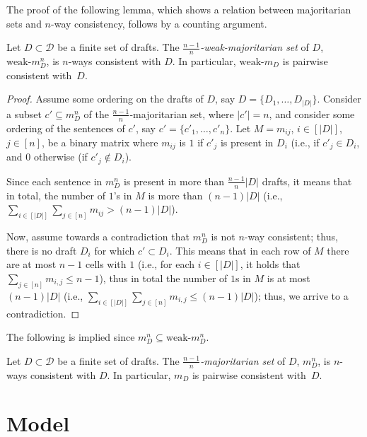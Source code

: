 \documentclass{llncs}
\newcommand{\calD}{\mathcal{D}}
\begin{document}
The proof of the following lemma, which shows a relation between majoritarian sets and $n$-way consistency, follows by a counting argument.

\begin{lemma}\label{lemma:wm-nwc}
  Let $D \subset \calD$ be a finite set of drafts. The \emph{$\frac{n-1}{n}$-weak-majoritarian set} of $D$, $\textrm{weak-}m^n_D$, is $n$-ways consistent with $D$. In particular, $\textrm{weak-}m_D$ is pairwise consistent with~$D$.
\end{lemma}

\begin{proof}
%
Assume some ordering on the drafts of $D$, say $D = \{D_1, \ldots, D_{|D|}\}$.
%
Consider a subset $c' \subseteq m^n_D$ of the $\frac{n-1}{n}$-majoritarian set, where $|c'| = n$, and consider some ordering of the sentences of $c'$, say $c' = \{c'_1, \ldots, c'_n\}$.
%
Let $M = m_{ij}$, $i \in [|D|]$, $j \in [n]$, be a binary matrix where $m_{ij}$ is $1$ if $c'_j$ is present in $D_i$ (i.e., if $c'_j \in D_i$, and $0$ otherwise (if $c'_j \notin D_i$).

Since each sentence in $m^n_D$ is present in more than $\frac{n-1}{n}|D|$ drafts, it means that in total, the number of $1$'s in $M$ is more than $(n-1)|D|$  (i.e., $\sum_{i \in [|D|]} \sum_{j \in [n]} m_{ij} > (n - 1)|D|$).

Now, assume towards a contradiction that $m^n_D$ is not $n$-way consistent; thus, there is no draft $D_i$ for which $c' \subset D_i$. This means that in each row of $M$ there are at most $n - 1$ cells with $1$ (i.e., for each $i \in [|D|]$, it holds that $\sum_{j \in [n]} m_{i,j} \leq n - 1$), thus in total the number of $1$s in $M$ is at most $(n - 1)|D|$ (i.e., $\sum_{i \in [|D|]}\sum_{j \in [n]} m_{i,j} \leq (n - 1)|D|$); thus, we arrive to a contradiction.
%
\end{proof}

The following is implied since $m^n_D \subseteq \textrm{weak-}m^n_D$.

\begin{corollary}
  Let $D \subset \calD$ be a finite set of drafts. The \emph{$\frac{n-1}{n}$-majoritarian set} of $D$, $m^n_D$, is $n$-ways consistent with $D$. In particular, $m_D$ is pairwise consistent with~$D$.
\end{corollary}


\section{Model}\label{section:model}
\end{document}
